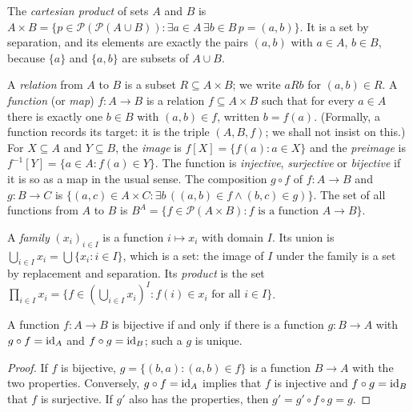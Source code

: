 \begin{definition}\label{sets:definition-product}
The \emph{cartesian product} of sets $A$ and $B$ is
$A \times B = \{p \in \mathcal{P}(\mathcal{P}(A \cup B)) : \exists a \in A\, \exists b \in B\, p = (a, b)\}$.
It is a set by separation, and its elements are exactly the pairs $(a, b)$
with $a \in A$, $b \in B$, because $\{a\}$ and $\{a, b\}$ are subsets of
$A \cup B$.
\end{definition}

\begin{definition}\label{sets:definition-function}
A \emph{relation} from $A$ to $B$ is a subset $R \subseteq A \times B$; we
write $a R b$ for $(a, b) \in R$. A \emph{function} (or \emph{map})
$f \colon A \to B$ is a relation $f \subseteq A \times B$ such that for every
$a \in A$ there is exactly one $b \in B$ with $(a, b) \in f$, written
$b = f(a)$. (Formally, a function records its target: it is the triple
$(A, B, f)$; we shall not insist on this.) For $X \subseteq A$ and
$Y \subseteq B$, the \emph{image} is $f[X] = \{f(a) : a \in X\}$ and the
\emph{preimage} is $f^{-1}[Y] = \{a \in A : f(a) \in Y\}$. The function is
\emph{injective}, \emph{surjective} or \emph{bijective} if it is so as a map in
the usual sense. The composition $g \circ f$ of $f \colon A \to B$ and
$g \colon B \to C$ is $\{(a, c) \in A \times C : \exists b\, ((a, b) \in f \wedge (b, c) \in g)\}$.
The set of all functions from $A$ to $B$ is
$B^A = \{f \in \mathcal{P}(A \times B) : f \text{ is a function } A \to B\}$.
\end{definition}

\begin{definition}\label{sets:definition-family}
A \emph{family} $(x_i)_{i \in I}$ is a function $i \mapsto x_i$ with domain $I$.
Its union is $\bigcup_{i \in I} x_i = \bigcup \{x_i : i \in I\}$, which is a set:
the image of $I$ under the family is a set by replacement and separation.
Its \emph{product} is the set
$\prod_{i \in I} x_i = \{f \in (\bigcup_{i \in I} x_i)^I : f(i) \in x_i \text{ for all } i \in I\}$.
\end{definition}

\begin{lemma}\label{sets:lemma-bijection-inverse}
A function $f \colon A \to B$ is bijective if and only if there is a function
$g \colon B \to A$ with $g \circ f = \mathrm{id}_A$ and $f \circ g = \mathrm{id}_B$; such a $g$
is unique.
\end{lemma}

\begin{proof}
If $f$ is bijective, $g = \{(b, a) : (a, b) \in f\}$ is a function $B \to A$
with the two properties. Conversely, $g \circ f = \mathrm{id}_A$ implies that $f$ is
injective and $f \circ g = \mathrm{id}_B$ that $f$ is surjective. If $g'$ also has the
properties, then $g' = g' \circ f \circ g = g$.
\end{proof}

